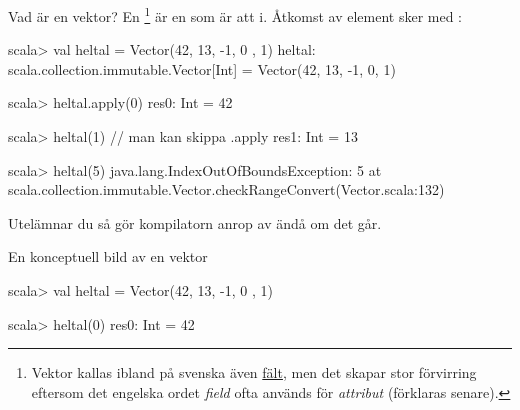 \begin{Slide}{Vad är en vektor?}\SlideFontSmall
En \footnote{Vektor kallas ibland på svenska även \href{https://sv.wikipedia.org/wiki/F\%C3\%A4lt_\%28datastruktur\%29}{fält}, men det skapar stor förvirring eftersom det engelska ordet \emph{field} ofta används för \emph{attribut} (förklaras senare).} 
 är en  som är  att  i. 
Åtkomst av element sker med : 

\begin{REPL}
scala> val heltal = Vector(42, 13, -1, 0 , 1)
heltal: scala.collection.immutable.Vector[Int] = Vector(42, 13, -1, 0, 1)

scala> heltal.apply(0)
res0: Int = 42

scala> heltal(1)    // man kan skippa .apply
res1: Int = 13

scala> heltal(5)
java.lang.IndexOutOfBoundsException: 5
  at scala.collection.immutable.Vector.checkRangeConvert(Vector.scala:132)
\end{REPL}
Utelämnar du  så gör kompilatorn anrop av  ändå om det går.
\end{Slide}

\begin{Slide}{En konceptuell bild av en vektor}

\begin{REPLnonum}
scala> val heltal = Vector(42, 13, -1, 0 , 1)

scala> heltal(0)
res0: Int = 42
\end{REPLnonum}


\end{Slide}



